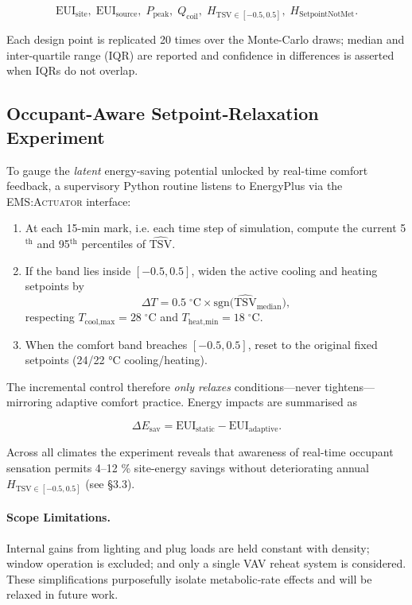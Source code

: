 \[
    \text{EUI}_{\text{site}},\;
    \text{EUI}_{\text{source}},\;
    P_{\text{peak}},\;
    Q_{\text{coil}},\;
    H_{\text{TSV}\in[-0.5,0.5]},\;
    H_{\text{SetpointNotMet}}.
\]

Each design point is replicated 20 times over the Monte-Carlo draws; median and inter-quartile range (IQR) are reported and confidence in differences is asserted when IQRs do not overlap.

\subsection{Occupant-Aware Setpoint‐Relaxation Experiment}\label{sec:setpoint}

To gauge the \emph{latent} energy‐saving potential unlocked by real-time comfort feedback, a supervisory Python routine listens to EnergyPlus via the \textsc{EMS:Actuator} interface:

\begin{enumerate}
\item At each 15-min mark, i.e. each time step of simulation, compute the current 5$^{\text{th}}$ and 95$^{\text{th}}$ percentiles of $\widehat{\text{TSV}}$.
\item If the band lies inside $[-0.5,0.5]$, widen the active cooling and heating setpoints by  
      \[
        \Delta T = 0.5\;^{\circ}\text{C}\times\text{sgn}\!\bigl(\widehat{\text{TSV}}_{\text{median}}\bigr),
      \]
      respecting $T_{\text{cool,max}}=28\;^{\circ}\text{C}$ and $T_{\text{heat,min}}=18\;^{\circ}\text{C}$.
\item When the comfort band breaches $[-0.5,0.5]$, reset to the original fixed setpoints (24/22 °C cooling/heating).
\end{enumerate}

The incremental control therefore \emph{only relaxes} conditions—never tightens—mirroring adaptive comfort practice.  Energy impacts are summarised as

\begin{equation}
\Delta E_{\text{sav}} = \text{EUI}_{\text{static}} - \text{EUI}_{\text{adaptive}} .
\end{equation}

Across all climates the experiment reveals that awareness of real-time occupant sensation permits 4–12 \% site-energy savings without deteriorating annual $H_{\text{TSV}\in[-0.5,0.5]}$ (see §3.3).  

\paragraph{Scope Limitations.}
Internal gains from lighting and plug loads are held constant with density; window operation is excluded; and only a single VAV reheat system is considered.  These simplifications purposefully isolate metabolic‐rate effects and will be relaxed in future work.

